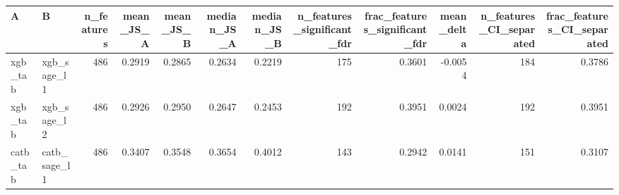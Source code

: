 \begin{tabular}{llrrrrrrrrrr}
\toprule
A & B & n\_features & mean\_JS\_A & mean\_JS\_B & median\_JS\_A & median\_JS\_B & n\_features\_significant\_fdr & frac\_features\_significant\_fdr & mean\_delta & n\_features\_CI\_separated & frac\_features\_CI\_separated \\
\midrule
xgb\_tab & xgb\_sage\_l1 & 486 & 0.2919 & 0.2865 & 0.2634 & 0.2219 & 175 & 0.3601 & -0.0054 & 184 & 0.3786 \\
xgb\_tab & xgb\_sage\_l2 & 486 & 0.2926 & 0.2950 & 0.2647 & 0.2453 & 192 & 0.3951 & 0.0024 & 192 & 0.3951 \\
catb\_tab & catb\_sage\_l1 & 486 & 0.3407 & 0.3548 & 0.3654 & 0.4012 & 143 & 0.2942 & 0.0141 & 151 & 0.3107 \\
\bottomrule
\end{tabular}
